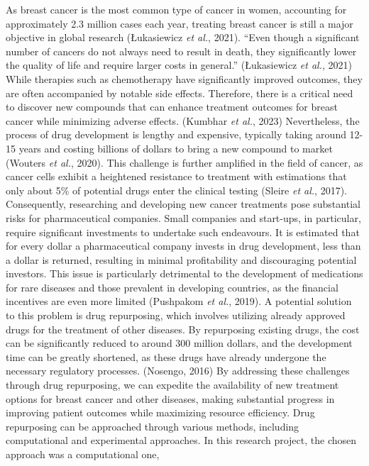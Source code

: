 \documentclass[
  11pt,
]{article}
\begin{document}
As breast cancer is the most common type of cancer in women, accounting
for approximately 2.3 million cases each year, treating breast cancer is
still a major objective in global research (Łukasiewicz \emph{et al.},
2021). ``Even though a significant number of cancers do not always need
to result in death, they significantly lower the quality of life and
require larger costs in general.'' (Łukasiewicz \emph{et al.}, 2021)
While therapies such as chemotherapy have significantly improved
outcomes, they are often accompanied by notable side effects. Therefore,
there is a critical need to discover new compounds that can enhance
treatment outcomes for breast cancer while minimizing adverse effects.
(Kumbhar \emph{et al.}, 2023) Nevertheless, the process of drug
development is lengthy and expensive, typically taking around 12-15
years and costing billions of dollars to bring a new compound to market
(Wouters \emph{et al.}, 2020). This challenge is further amplified in
the field of cancer, as cancer cells exhibit a heightened resistance to
treatment with estimations that only about 5\% of potential drugs enter
the clinical testing (Sleire \emph{et al.}, 2017). Consequently,
researching and developing new cancer treatments pose substantial risks
for pharmaceutical companies. Small companies and start-ups, in
particular, require significant investments to undertake such
endeavours. It is estimated that for every dollar a pharmaceutical
company invests in drug development, less than a dollar is returned,
resulting in minimal profitability and discouraging potential investors.
This issue is particularly detrimental to the development of medications
for rare diseases and those prevalent in developing countries, as the
financial incentives are even more limited (Pushpakom \emph{et al.},
2019). A potential solution to this problem is drug repurposing, which
involves utilizing already approved drugs for the treatment of other
diseases. By repurposing existing drugs, the cost can be significantly
reduced to around 300 million dollars, and the development time can be
greatly shortened, as these drugs have already undergone the necessary
regulatory processes. (Nosengo, 2016) By addressing these challenges
through drug repurposing, we can expedite the availability of new
treatment options for breast cancer and other diseases, making
substantial progress in improving patient outcomes while maximizing
resource efficiency. Drug repurposing can be approached through various
methods, including computational and experimental approaches. In this
research project, the chosen approach was a computational one,
\end{document}
